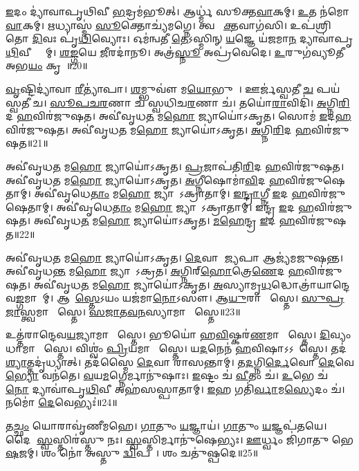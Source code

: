 \ul{𑌇}𑌦𑌂 𑌦𑍍𑌯𑌾॑𑌵𑌾𑌪𑍃𑌥𑌿𑌵𑍀 \ul{𑌭}𑌦𑍍𑌰𑌮॑𑌭𑍂𑌤𑍍।
𑌆𑌰𑍍𑌧𑍍𑌮॑ 𑌸𑍂𑌕𑍍𑌤\ul{𑌵𑌾}𑌕𑌮𑍍।
\ul{𑌉}𑌤 𑌨॑𑌮𑍋\ul{𑌵𑌾}𑌕𑌮𑍍।
\ul{𑌋}𑌧𑍍𑌯𑌾𑌸𑍍𑌮॑ \ul{𑌸𑍂}𑌕𑍍𑌤𑍋𑌚𑍍𑌯॑𑌮𑌗𑍍𑌨𑍇।
𑌤𑍍𑌵 𑌸𑍂᳚\ul{𑌕𑍍𑌤}𑌵𑌾𑌗॑𑌸𑌿।
𑌉𑌪॑𑌶𑍍𑌰𑌿𑌤𑍋 \ul{𑌦𑌿}𑌵𑌃 𑌪𑍃॑\ul{𑌥𑌿}𑌵𑍍𑌯𑍋𑌃।
𑌓𑌮॑𑌨𑍍𑌵𑌤𑍀 \ul{𑌤𑍇}\-𑌽𑌸𑍍𑌮𑌿𑌨𑍍 \ul{𑌯}𑌜𑍍𑌞𑍇 𑌯॑𑌜𑌮𑌾\ul{𑌨} 𑌦𑍍𑌯𑌾𑌵𑌾॑𑌪𑍃\ul{𑌥𑌿}𑌵𑍀 𑌸𑍍𑌤𑌾᳚𑌮𑍍।
\ul{𑌶}\ul{𑌙𑍍𑌗}𑌯𑍇 \ul{𑌜𑍀}𑌰𑌦𑌾॑𑌨𑍂।
𑌅𑌤𑍍𑌰॑\ul{𑌸𑍍𑌨𑍂} 𑌅𑌪𑍍𑌰॑𑌵𑍇𑌦𑍇।
\ul{𑌉}𑌰𑍁𑌗॑𑌵𑍍𑌯𑍂𑌤𑍀 𑌅𑌭\ul{𑌯𑌂} 𑌕𑍃𑌤𑍗᳚॥20॥

\ul{𑌵𑍃}𑌷𑍍𑌟𑌿𑌦𑍍𑌯𑌾॑𑌵𑌾 \ul{𑌰𑍀}𑌤𑍍𑌯𑌾॑𑌪𑌾।
\ul{𑌶}𑌮𑍍𑌭𑍁𑌵𑍗॑ 𑌮\ul{𑌯𑍋}𑌭𑍁𑌵𑍗᳚।
𑌊𑌰𑍍𑌜॑𑌸𑍍𑌵𑌤𑍀 \ul{𑌚} 𑌪𑌯॑𑌸𑍍𑌵𑌤𑍀 𑌚।
\ul{𑌸𑍂}\ul{𑌪}\ul{𑌚}\ul{𑌰}𑌣𑌾 𑌚॑ 𑌸𑍍𑌵𑌧𑌿𑌚\ul{𑌰}𑌣𑌾 𑌚॑।
𑌤𑌯𑍋॑\ul{𑌰𑌾}𑌵𑌿𑌦𑌿॑।
\ul{𑌅}𑌗𑍍𑌨𑌿\ul{𑌰𑌿}𑌦 \ul{𑌹}𑌵𑌿𑌰॑𑌜𑍁𑌷𑌤।
𑌅𑌵𑍀॑𑌵𑍃𑌧\ul{𑌤} 𑌮\ul{𑌹𑍋} 𑌜𑍍𑌯𑌾𑌯𑍋॑𑌽𑌕𑍃𑌤।
𑌸𑍋𑌮॑ \ul{𑌇}𑌦\ul{𑌹}𑌵𑌿𑌰॑𑌜𑍁𑌷𑌤।
𑌅𑌵𑍀॑𑌵𑍃𑌧\ul{𑌤} 𑌮\ul{𑌹𑍋} 𑌜𑍍𑌯𑌾𑌯𑍋॑𑌽𑌕𑍃𑌤।
\ul{𑌅}𑌗𑍍𑌨𑌿\ul{𑌰𑌿}𑌦 \ul{𑌹}𑌵𑌿𑌰॑𑌜𑍁𑌷𑌤॥21॥

𑌅𑌵𑍀॑𑌵𑍃𑌧\ul{𑌤} 𑌮\ul{𑌹𑍋} 𑌜𑍍𑌯𑌾𑌯𑍋॑𑌽𑌕𑍃𑌤।
\ul{𑌪𑍍𑌰}𑌜𑌾𑌪॑𑌤𑌿\ul{𑌰𑌿}𑌦 \ul{𑌹}𑌵𑌿𑌰॑𑌜𑍁𑌷𑌤।
𑌅𑌵𑍀॑𑌵𑍃𑌧\ul{𑌤} 𑌮\ul{𑌹𑍋} 𑌜𑍍𑌯𑌾𑌯𑍋॑𑌽𑌕𑍃𑌤।
\ul{𑌅}𑌗𑍍𑌨𑍀𑌷𑍋𑌮𑌾॑\ul{𑌵𑌿}𑌦 \ul{𑌹}𑌵𑌿𑌰॑𑌜𑍁𑌷𑍇𑌤𑌾𑌮𑍍।
𑌅𑌵𑍀॑𑌵𑍃𑌧𑍇\ul{𑌤𑌾𑌂} 𑌮\ul{𑌹𑍋} 𑌜𑍍𑌯𑌾𑌯𑍋᳚\-𑌽𑌕𑍍𑌰𑌾𑌤𑌾𑌮𑍍।
\ul{𑌇}\ul{𑌨𑍍𑌦𑍍𑌰𑌾}𑌗𑍍𑌨𑍀 \ul{𑌇}𑌦 \ul{𑌹}𑌵𑌿𑌰॑𑌜𑍁𑌷𑍇𑌤𑌾𑌮𑍍।
𑌅𑌵𑍀॑𑌵𑍃𑌧𑍇\ul{𑌤𑌾𑌂} 𑌮\ul{𑌹𑍋} 𑌜𑍍𑌯𑌾𑌯𑍋᳚\-𑌽𑌕𑍍𑌰𑌾𑌤𑌾𑌮𑍍।
𑌇𑌨𑍍𑌦𑍍𑌰॑ \ul{𑌇}𑌦 \ul{𑌹}𑌵𑌿𑌰॑𑌜𑍁𑌷𑌤।
𑌅𑌵𑍀॑𑌵𑍃𑌧\ul{𑌤} 𑌮\ul{𑌹𑍋} 𑌜𑍍𑌯𑌾𑌯𑍋॑𑌽𑌕𑍃𑌤।
\ul{𑌮}\ul{𑌹𑍇}𑌨𑍍𑌦𑍍𑌰 \ul{𑌇}𑌦 \ul{𑌹}𑌵𑌿𑌰॑𑌜𑍁𑌷𑌤॥22॥

𑌅𑌵𑍀॑𑌵𑍃𑌧\ul{𑌤} 𑌮\ul{𑌹𑍋} 𑌜𑍍𑌯𑌾𑌯𑍋॑𑌽𑌕𑍃𑌤।
\ul{𑌦𑍇}𑌵𑌾 𑌆᳚\ul{𑌜𑍍𑌯}𑌪𑌾 𑌆𑌜𑍍𑌯॑𑌮𑌜𑍁𑌷𑌨𑍍𑌤।
𑌅𑌵𑍀॑𑌵𑍃𑌧\ul{𑌨𑍍𑌤} 𑌮\ul{𑌹𑍋} 𑌜𑍍𑌯𑌾𑌯𑍋᳚\-𑌽𑌕𑍍𑌰𑌤।
\ul{𑌅}𑌗𑍍𑌨𑌿𑌰𑍍‌\mbox{}\ul{𑌹𑍋}𑌤𑍍𑌰𑍇\ul{𑌣𑍇}𑌦 \ul{𑌹}𑌵𑌿𑌰॑𑌜𑍁𑌷𑌤।
𑌅𑌵𑍀॑𑌵𑍃𑌧\ul{𑌤} 𑌮\ul{𑌹𑍋} 𑌜𑍍𑌯𑌾𑌯𑍋॑𑌽𑌕𑍃𑌤।
\ul{𑌅}𑌸𑍍𑌯𑌾𑌮𑍃\ul{𑌧}𑌦𑍍𑌧𑍋𑌤𑍍𑌰𑌾॑𑌯𑌾𑌨𑍍𑌦𑍇𑌵\ul{𑌙𑍍𑌗}𑌮𑌾𑌯𑌾᳚𑌮𑍍।
𑌆𑌶𑌾᳚\ul{𑌸𑍍𑌤𑍇}𑌽𑌯𑌂 𑌯𑌜॑𑌮𑌾\ul{𑌨𑍋}𑌽𑌸𑍗।
𑌆\ul{𑌯𑍁}𑌰𑌾 𑌶𑌾᳚𑌸𑍍𑌤𑍇।
\ul{𑌸𑍁}\ul{𑌪𑍍𑌰}\ul{𑌜𑌾}𑌸𑍍𑌤𑍍𑌵𑌮𑌾 𑌶𑌾᳚𑌸𑍍𑌤𑍇।
\ul{𑌸}\ul{𑌜𑌾}\ul{𑌤}\ul{𑌵}\ul{𑌨}𑌸𑍍𑌯𑌾𑌮𑌾 𑌶𑌾᳚𑌸𑍍𑌤𑍇॥23॥

𑌉𑌤𑍍𑌤॑𑌰𑌾𑌨𑍍𑌦𑍇𑌵\ul{𑌯}𑌜𑍍𑌯𑌾𑌮𑌾 𑌶𑌾᳚𑌸𑍍𑌤𑍇।
𑌭𑍂𑌯𑍋॑ 𑌹\ul{𑌵𑌿}𑌷𑍍𑌕𑌰॑\ul{𑌣}𑌮𑌾 𑌶𑌾᳚𑌸𑍍𑌤𑍇।
\ul{𑌦𑌿}𑌵𑍍𑌯𑌂 𑌧𑌾𑌮𑌾 𑌶𑌾᳚𑌸𑍍𑌤𑍇।
𑌵𑌿𑌶𑍍𑌵𑌂॑ \ul{𑌪𑍍𑌰𑌿}𑌯𑌮𑌾 𑌶𑌾᳚𑌸𑍍𑌤𑍇।
𑌯\ul{𑌦}𑌨𑍇𑌨॑ \ul{𑌹}𑌵𑌿𑌷𑌾\-𑌽𑌽𑌶𑌾᳚𑌸𑍍𑌤𑍇।
𑌤𑌦॑\ul{𑌶𑍍𑌯𑌾}𑌤𑍍𑌤𑌦𑍃॑𑌧𑍍𑌯𑌾𑌤𑍍।
𑌤𑌦॑𑌸𑍍𑌮𑍈 \ul{𑌦𑍇}𑌵𑌾 𑌰𑌾॑𑌸𑌨𑍍𑌤𑌾𑌮𑍍।
𑌤\ul{𑌦}𑌗𑍍𑌨𑌿\ul{𑌰𑍍𑌦𑍇}𑌵𑍋 \ul{𑌦𑍇}𑌵𑍇\ul{𑌭𑍍𑌯𑍋} 𑌵𑌨॑𑌤𑍇।
\ul{𑌵}𑌯\ul{𑌮}𑌗𑍍𑌨𑍇𑌰𑍍𑌮𑌾𑌨𑍁॑𑌷𑌾𑌃।
\ul{𑌇}𑌷𑍍𑌟𑌂 𑌚॑ \ul{𑌵𑍀}𑌤𑌂 𑌚॑।
\ul{𑌉}𑌭𑍇 𑌚॑ \ul{𑌨𑍋} 𑌦𑍍𑌯𑌾𑌵𑌾॑𑌪𑍃\ul{𑌥𑌿}𑌵𑍀 𑌅𑌹॑𑌸𑌸𑍍𑌪𑌾𑌤𑌾𑌮𑍍।
\ul{𑌇}𑌹 𑌗𑌤𑌿॑\ul{𑌰𑍍𑌵𑌾}𑌮\ul{𑌸𑍍𑌯𑍇}𑌦𑌂 𑌚॑।
𑌨𑌮𑍋॑ \ul{𑌦𑍇}𑌵𑍇𑌭𑍍𑌯𑌃॑॥24॥

𑌤\ul{𑌚𑍍𑌛𑌂} 𑌯𑍋𑌰𑌾𑌵𑍃॑𑌣𑍀𑌮𑌹𑍇।
\ul{𑌗𑌾}𑌤𑍁𑌂 \ul{𑌯}𑌜𑍍𑌞𑌾𑌯॑।
\ul{𑌗𑌾}𑌤𑍁𑌂 \ul{𑌯}𑌜𑍍𑌞𑌪॑𑌤𑌯𑍇।
𑌦𑍈𑌵𑍀᳚ \ul{𑌸𑍍𑌵}𑌸𑍍𑌤𑌿𑌰॑𑌸𑍍𑌤𑍁 𑌨𑌃।
\ul{𑌸𑍍𑌵}𑌸𑍍𑌤𑌿𑌰𑍍𑌮𑌾𑌨𑍁॑𑌷𑍇𑌭𑍍𑌯𑌃।
\ul{𑌊}𑌰𑍍𑌧𑍍𑌵𑌂 𑌜𑌿॑𑌗𑌾𑌤𑍁 𑌭𑍇\ul{𑌷}𑌜𑌮𑍍।
𑌶𑌂 𑌨𑍋॑ 𑌅𑌸𑍍𑌤𑍁 \ul{𑌦𑍍𑌵𑌿}𑌪𑌦𑍇᳚।
𑌶𑌂 𑌚𑌤𑍁॑𑌷𑍍𑌪𑌦𑍇॥25॥\anuvakamend[𑌤\ul{𑌚𑍍𑌛𑌂} 𑌯𑍋\ul{𑌰}𑌷𑍍𑌟𑍗]

